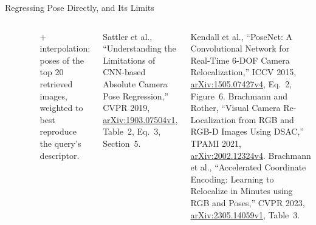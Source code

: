 \begin{frame}{Regressing Pose Directly, and Its Limits}
\begin{columns}[T,onlytextwidth]
{\begin{tabular}{l l r}
        \bottomrule
      \end{tabular}\par}
      \vspace{0.2em}
      {\scriptsize + interpolation: poses of the top 20 retrieved images, weighted to best reproduce the query's descriptor.\par}
      \vspace{0.3em}
      {\scriptsize Sattler et al., ``Understanding the Limitations of CNN-based Absolute Camera Pose Regression,'' CVPR 2019, \href{https://arxiv.org/abs/1903.07504v1}{arXiv:1903.07504v1}, Table~2, Eq.~3, Section~5.\par}
      \vspace{0.3em}
      {\scriptsize Kendall et al., ``PoseNet: A Convolutional Network for Real-Time 6-DOF Camera Relocalization,'' ICCV 2015, \href{https://arxiv.org/abs/1505.07427v4}{arXiv:1505.07427v4}, Eq.~2, Figure~6. Brachmann and Rother, ``Visual Camera Re-Localization from RGB and RGB-D Images Using DSAC,'' TPAMI 2021, \href{https://arxiv.org/abs/2002.12324v4}{arXiv:2002.12324v4}. Brachmann et al., ``Accelerated Coordinate Encoding: Learning to Relocalize in Minutes using RGB and Poses,'' CVPR 2023, \href{https://arxiv.org/abs/2305.14059v1}{arXiv:2305.14059v1}, Table~3.\par}
  \end{columns}
\end{frame}

